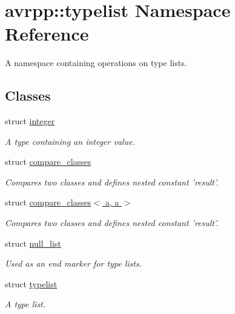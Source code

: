 \hypertarget{namespaceavrpp_1_1typelist}{
\section{avrpp::typelist Namespace Reference}
\label{namespaceavrpp_1_1typelist}
}


A namespace containing operations on type lists.  


\subsection*{Classes}
\begin{DoxyCompactItemize}
\item 
struct \hyperlink{structavrpp_1_1typelist_1_1integer}{integer}
\begin{DoxyCompactList}\small\item\em A type containing an integer value. \item\end{DoxyCompactList}\item 
struct \hyperlink{structavrpp_1_1typelist_1_1compare__classes}{compare\_\-classes}
\begin{DoxyCompactList}\small\item\em Compares two classes and defines nested constant 'result'. \item\end{DoxyCompactList}\item 
struct \hyperlink{structavrpp_1_1typelist_1_1compare__classes_3_01a_00_01a_01_4}{compare\_\-classes$<$ a, a $>$}
\begin{DoxyCompactList}\small\item\em Compares two classes and defines nested constant 'result'. \item\end{DoxyCompactList}\item 
struct \hyperlink{structavrpp_1_1typelist_1_1null__list}{null\_\-list}
\begin{DoxyCompactList}\small\item\em Used as an end marker for type lists. \item\end{DoxyCompactList}\item 
struct \hyperlink{structavrpp_1_1typelist_1_1typelist}{typelist}
\begin{DoxyCompactList}\small\item\em A type list. \item\end{DoxyCompactList}\item 

\end{DoxyCompactItemize}
